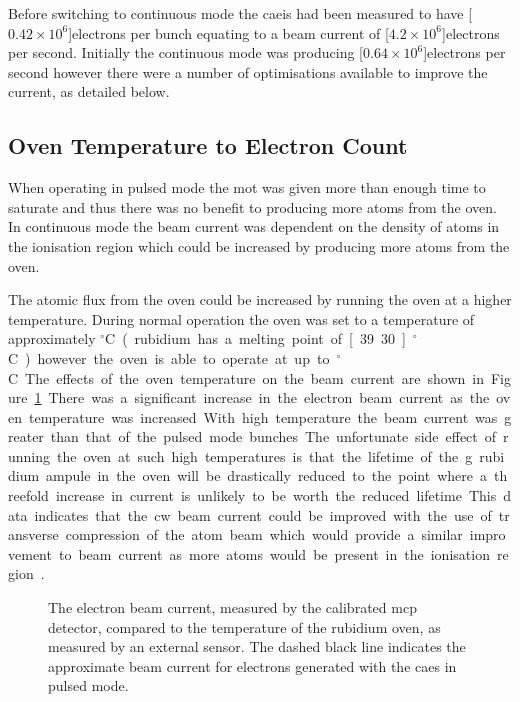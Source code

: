 Before switching to continuous mode the \gls{caeis} had been measured to have \unit[$0.42\times10^6$]{electrons per bunch} equating to a beam current of \unit[$4.2\times10^6$]{electrons per second}.
Initially the continuous mode was producing \unit[$0.64\times10^6$]{electrons per second} however there were a number of optimisations available to improve the current, as detailed below.

\subsection{Oven Temperature to Electron Count}
When operating in pulsed mode the \gls{mot} was given more than enough time to saturate and thus there was no benefit to producing more atoms from the oven.
In continuous mode the beam current was dependent on the density of atoms in the ionisation region which could be increased by producing more atoms from the oven.

The atomic flux from the oven could be increased by running the oven at a higher temperature.
During normal operation the oven was set to a temperature of approximately \unit[80]{$^\circ$C} (rubidium has a melting point of \unit[39.30]{$^\circ$C}) however the oven is able to operate at up to \unit[200]{$^\circ$C}.

The effects of the oven temperature on the beam current are shown in Figure~\ref{figure:oven_counts}.
There was a significant increase in the electron beam current as the oven temperature was increased.
With high temperature the beam current was greater than that of the pulsed mode bunches.
The unfortunate side effect of running the oven at such high temperatures is that the lifetime of the \unit[5]{g} rubidium ampule in the oven will be drastically reduced to the point where a threefold increase in current is unlikely to be worth the reduced lifetime.
This data indicates that the \gls{cw} beam current could be improved with the use of transverse compression of the atom beam which would provide a similar improvement to beam current as more atoms would be present in the ionisation region~\cite{tielen_development_2015}.

\begin{figure}
    \center
    
    \caption[Beam current and rubidium oven temperature.]{The electron beam current, measured by the calibrated \gls{mcp} detector, compared to the temperature of the rubidium oven, as measured by an external sensor.
    The dashed black line indicates the approximate beam current for electrons generated with the \gls{caes} in pulsed mode.}
    \label{figure:oven_counts}
\end{figure}

